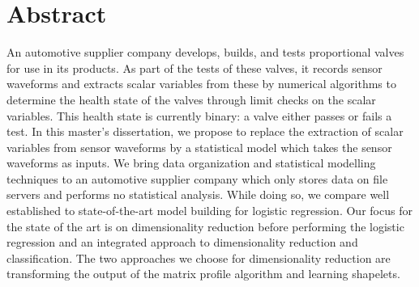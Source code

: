\chapter{Abstract}

An automotive supplier company develops, builds, and tests proportional valves for use in its products. As part of the tests
of these valves, it records sensor waveforms and extracts scalar variables from these by numerical algorithms to determine
the health state of the valves through limit checks on the scalar variables. This health state is currently binary: a valve either
passes or fails a test. In this master’s dissertation, we propose to replace the extraction of scalar variables from sensor
waveforms by a statistical model which takes the sensor waveforms as inputs.
We bring data organization and statistical modelling techniques to an
automotive supplier company which only stores data on file servers and performs no statistical analysis. While doing so,
we compare well established to state-of-the-art model building for logistic regression. Our focus for the state of the
art is on dimensionality reduction before performing the logistic regression and an integrated approach to dimensionality
reduction and classification.
The two approaches we choose for dimensionality reduction are transforming the output of the matrix profile algorithm and learning shapelets.
